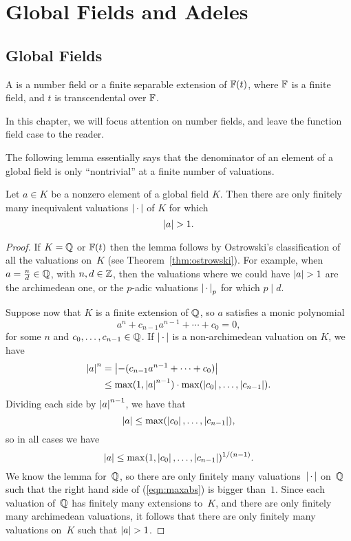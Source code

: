 \chapter{Global Fields and Adeles}
\section{Global Fields}\label{sec:global_fields}
\begin{definition}
  A  is a number field or a finite separable
  extension of $\mathbb{F}(t)$, where $\mathbb{F}$ is a finite field, and $t$ is
  transcendental over $\mathbb{F}$.
\end{definition}

In this chapter, we will focus attention on number fields, and leave
the function field case to the reader.

The following lemma essentially says that the denominator of an
element of a global field is only ``nontrivial'' at a finite number of
valuations.
\begin{lemma}\label{lem:absbig}
Let $a\in K$ be a nonzero element of a global field $K$.  Then
there are only finitely many inequivalent valuations $\left|\,\cdot\,\right|$
of $K$ for which
$$
  \left|a\right| > 1.
$$
\end{lemma}
\begin{proof}
  If $K=\mathbb{Q}$ or $\mathbb{F}(t)$ then the lemma follows by Ostrowski's
  classification of all the valuations on~$K$ (see
Theorem~\ref{thm:ostrowski}). For example,
  when $a=\frac{n}{d}\in\mathbb{Q}$, with $n,d\in \mathbb{Z}$, then the valuations
  where we could have $\abs{a}>1$ are the archimedean one, or the
  $p$-adic valuations $\left|\,\cdot\,\right|_p$ for which $p\mid d$.

Suppose now that $K$ is a finite extension of $\mathbb{Q}$, so
$a$ satisfies a monic polynomial
$$
  a^n + c_{n-1} a^{n-1} + \cdots + c_0 = 0,
$$
for some $n$ and $c_0,\ldots, c_{n-1}\in\mathbb{Q}$.
If $\left|\,\cdot\,\right|$ is a non-archimedean valuation on $K$, we have
\begin{align*}
  \left|a\right|^n &= \left|-(c_{n-1} a^{n-1} + \cdots + c_0)\right| \\
      &\leq \max(1,\left|a\right|^{n-1})\cdot \max(\left|c_0\right|,\ldots,\left|c_{n-1}\right|).
\end{align*}
Dividing each side by $\left|a\right|^{n-1}$, we have
that
$$
   \left|a\right| \leq \max(\left|c_0\right|,\ldots,\left|c_{n-1}\right|),
$$
so in all cases we have
\begin{equation}\label{eqn:maxabs}
   \left|a\right| \leq \max(1, \left|c_0\right|,
   \ldots,\left|c_{n-1}\right|)^{1/(n-1)}.
\end{equation}
We know the lemma for~$\mathbb{Q}$, so there are only finitely many
valuations~$\left|\,\cdot\,\right|$ on~$\mathbb{Q}$ such that the right hand side of
(\ref{eqn:maxabs}) is bigger than~$1$.  Since each valuation of~$\mathbb{Q}$
has finitely many extensions to~$K$, and there are only finitely many
archimedean valuations, it follows that there are only finitely many
valuations on~$K$ such that $\abs{a}>1$.
\end{proof}

